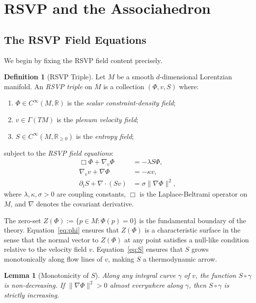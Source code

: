 \documentclass[12pt, oneside]{amsart}
\theoremstyle{plain}
\newtheorem{lemma}[theorem]{Lemma}
\theoremstyle{definition}
\newtheorem{definition}[theorem]{Definition}
\theoremstyle{remark}
\newcommand{\R}{\mathbb{R}}
\begin{document}
\section{RSVP and the Associahedron}
\label{sec:rsvp}

\subsection{The RSVP Field Equations}

We begin by fixing the RSVP field content precisely.

\begin{definition}[RSVP Triple]
\label{def:rsvp}
Let $M$ be a smooth $d$-dimensional Lorentzian manifold. An \emph{RSVP triple} on $M$ is a collection $(\Phi, v, S)$ where:
\begin{enumerate}[label=(\roman*)]
  \item $\Phi \in C^\infty(M, \R)$ is the \emph{scalar constraint-density field};
  \item $v \in \Gamma(TM)$ is the \emph{plenum velocity field};
  \item $S \in C^\infty(M, \R_{\geq 0})$ is the \emph{entropy field};
\end{enumerate}
subject to the \emph{RSVP field equations}:
\begin{align}
  \Box \Phi + \nabla_v \Phi &= -\lambda S \Phi, \label{eq:phi}\\
  \nabla_v v + \nabla \Phi &= -\kappa v, \label{eq:v}\\
  \partial_t S + \nabla \cdot (Sv) &= \sigma \|\nabla \Phi\|^2, \label{eq:S}
\end{align}
where $\lambda, \kappa, \sigma > 0$ are coupling constants, $\Box$ is the Laplace-Beltrami operator on $M$, and $\nabla$ denotes the covariant derivative.
\end{definition}

The zero-set $Z(\Phi) := \{p \in M : \Phi(p) = 0\}$ is the fundamental boundary of the theory. Equation~\eqref{eq:phi} ensures that $Z(\Phi)$ is a characteristic surface in the sense that the normal vector to $Z(\Phi)$ at any point satisfies a null-like condition relative to the velocity field $v$. Equation~\eqref{eq:S} ensures that $S$ grows monotonically along flow lines of $v$, making $S$ a thermodynamic arrow.

\begin{lemma}[Monotonicity of $S$]
\label{lem:S-monotone}
Along any integral curve $\gamma$ of $v$, the function $S \circ \gamma$ is non-decreasing. If $\|\nabla\Phi\|^2 > 0$ almost everywhere along $\gamma$, then $S \circ \gamma$ is strictly increasing.
\end{lemma}
\end{document}
